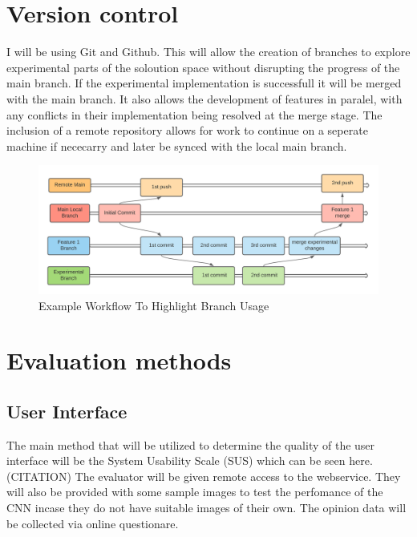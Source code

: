 \section{Version control}
  I will be using Git and Github. This will allow the creation of branches to explore experimental parts of the soloution space without disrupting the progress of the main branch. If the experimental implementation is successfull it will be merged with the main branch. It also allows the development of features in paralel, with any conflicts in their implementation being resolved at the merge stage. The inclusion of a remote repository allows for work to continue on a seperate machine if nececarry and later be synced with the local main branch.
  \begin{figure}[H]
    \begin{center}
      \includegraphics[scale=0.7]{Images/Git_Workflow_Diagram}
      \caption{Example Workflow To Highlight Branch Usage}
      \label{fig:Git Workflow}
    \end{center}
  \end{figure}

\section{Evaluation methods}
  \subsection{User Interface}
  The main method that will be utilized to determine the quality of the user interface will be the System Usability Scale (SUS) which can be seen here. (CITATION) %
  The evaluator will be given remote access to the webservice. They will also be provided with some sample images to test the perfomance of the CNN incase they do not have suitable images of their own.
  The opinion data will be collected via online questionare.

